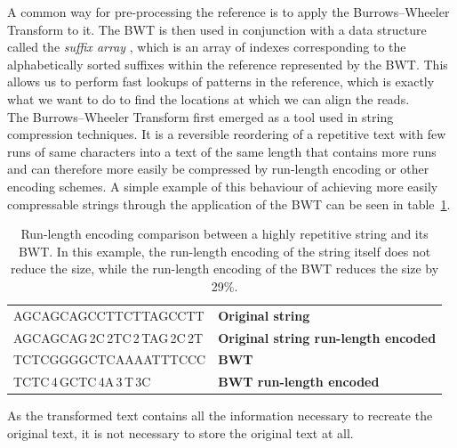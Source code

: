 \documentclass[a4paper,12pt,twoside,BCOR=10mm]{scrbook}
\begin{document}
A common way for pre-processing the reference is to apply the Burrows--Wheeler Transform \citep{Burrows1994} to it.
The BWT is then used in conjunction with a data structure
called the \textit{suffix array} \citep{Puglisi2007}, which
is an array of indexes corresponding to the alphabetically sorted suffixes
within the reference represented by the BWT.
This allows us to
perform fast lookups of patterns in the reference, which is exactly what we want
to do to find the locations at which we can align the reads. \\
The Burrows--Wheeler Transform
first emerged as a tool used in string compression techniques.
It is a reversible reordering of a
repetitive text with few runs of same characters into a text of the same length that contains more runs
and can therefore more easily be compressed by run-length encoding or other encoding schemes.
A simple example of this behaviour of achieving more easily compressable strings through the application of the BWT
can be seen in table~\ref{table:evo_background_bwt_run_enc}.
\begin{table}[htb]
\centering
\caption[Run-length encoding comparison between a repetitive string and its BWT]{Run-length encoding comparison between a highly repetitive string and its BWT. In this example, the run-length encoding of the string itself does not reduce the size, while the run-length encoding of the BWT reduces the size by 29\%.}
   \begin{tabularx}{\textwidth}{ | X | X | }
   \hline
   AGCAGCAGCCTTCTTAGCCTT & \textbf{Original string} \\
   AGCAGCAG\,2C\,2TC\,2\,TAG\,2C\,2T & \textbf{Original string run-length encoded} \\
   \hline
   TCTCGGGGCTCAAAATTTCCC & \textbf{BWT} \\
   TCTC\,4\,GCTC\,4A\,3\,T\,3C & \textbf{BWT run-length encoded} \\
   \hline
   \end{tabularx}
\label{table:evo_background_bwt_run_enc}
\end{table}
As the transformed text contains all the information necessary to recreate the
original text, it is not necessary to store the original text at all.
\end{document}
